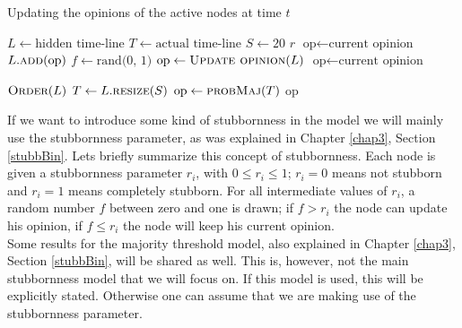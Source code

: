 \documentclass[11 pt , letterpaper , twoside , openright]{book}
\begin{document}
\begin{algorithm}
\caption{Updating the opinions of the active nodes at time $t$}
\label{alg:update}
\begin{algorithmic}[1]
	\State \(L \leftarrow \text{hidden time-line}\)
	\State \(T \leftarrow \text{actual time-line}\)
	\State \(S \leftarrow 20\) 
	\State \(r\) 
		\State \(\text{op} \leftarrow \text{current opinion}\)
		 
			\State \(L.\textsc{add}\text{(op)}\)
		\EndFor
		\State \(f \leftarrow \text{rand(0, 1)}\) 
			\State \(\text{op} \leftarrow \Call{Update opinion}{L}\) 
		\Else
			\State \(\text{op} \leftarrow \text{current opinion}\) 
		\EndIf
	\EndFor
	
		\State \(\textsc{Order}(L)\) 
			\State \(T \leftarrow L.\textsc{resize}(S)\) 
		\EndIf
		\State \(\text{op} \leftarrow \textsc{probMaj}(T)\) 
	\State \Return op 
	\EndFunction
\end{algorithmic}
\end{algorithm}
\noindent
If we want to introduce some kind of stubbornness in the model we will mainly use the stubbornness parameter, as was explained in Chapter \ref{chap3}, Section \ref{stubbBin}. Lets briefly summarize this concept of stubbornness. Each node is given a stubbornness parameter $r_i$, with $0 \leqslant r_i \leqslant 1$; $r_i = 0$ means not stubborn and $r_i = 1$ means completely stubborn. For all intermediate values of $r_i$, a random number $f$ between zero and one is drawn; if $f > r_i$ the node can update his opinion, if $f \leqslant r_i$ the node will keep his current opinion.\\
Some results for the majority threshold model, also explained in Chapter \ref{chap3}, Section \ref{stubbBin}, will be shared as well. This is, however, not the main stubbornness model that we will focus on. If this model is used, this will be explicitly stated. Otherwise one can assume that we are making use of the stubbornness parameter.\\
\end{document}
